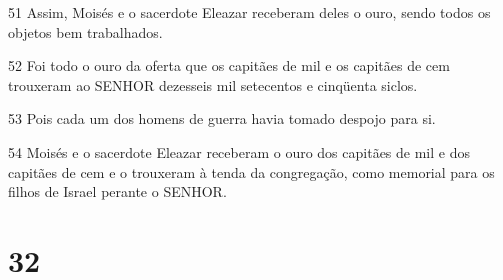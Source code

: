 \par 51 Assim, Moisés e o sacerdote Eleazar receberam deles o ouro, sendo todos os objetos bem trabalhados.
\par 52 Foi todo o ouro da oferta que os capitães de mil e os capitães de cem trouxeram ao SENHOR dezesseis mil setecentos e cinqüenta siclos.
\par 53 Pois cada um dos homens de guerra havia tomado despojo para si.
\par 54 Moisés e o sacerdote Eleazar receberam o ouro dos capitães de mil e dos capitães de cem e o trouxeram à tenda da congregação, como memorial para os filhos de Israel perante o SENHOR.

\chapter{32}

